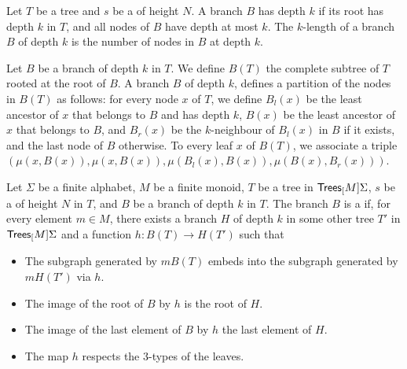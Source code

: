\begin{definition}
    \label{ramseyan-branch:def}
    Let $T$ be a tree and $s$ be a  of height $N$.
    A branch $B$ has depth $k$ if its root has depth $k$ in $T$,
    and all nodes of $B$ have depth at most $k$.
    The $k$-length of a branch $B$ of depth $k$ is the number of nodes in $B$
    at depth $k$.
\end{definition}

\AP Let $B$ be a branch of depth $k$ in $T$. We define $B(T)$ the complete
subtree of $T$ rooted at the root of $B$. A branch $B$ of depth $k$, defines a
partition of the nodes in $B(T)$ as follows: for every node $x$ of $T$, we
define $B_l(x)$ be the least ancestor of $x$ that belongs to $B$ and has depth
$k$, $B(x)$ be the least ancestor of $x$ that belongs to $B$, and $B_r(x)$ be
the $k$-neighbour of $B_l(x)$ in $B$ if it exists, and the last node of $B$
otherwise. To every leaf $x$ of $B(T)$, we associate a triple $(\mu(x, B(x)),
\mu(x,B(x)), \mu(B_l(x), B(x)), \mu(B(x), B_r(x)))$.

\begin{definition}
    \label{good-branch:def}
    Let $\Sigma$ be a finite alphabet, $M$ be a finite monoid, 
    $T$ be a tree in $\mathsf{Trees}_{[}M]{\Sigma}$, $s$ be a 
     of height $N$ in $T$,
    and $B$ be a branch of depth $k$ in $T$.
    The branch $B$ is a  if, for every element $m \in M$,
    there exists a branch $H$ of depth $k$ in some other tree $T'$ in $\mathsf{Trees}_{[}M]{\Sigma}$
    and a function $h \colon B(T) \to H(T')$ such that
    \begin{itemize}
        \item The subgraph generated by $m B(T)$ embeds into the subgraph generated by $m H(T')$ via $h$.
        \item The image of the root of $B$ by $h$ is the root of $H$.
        \item The image of the last element of $B$ by $h$ the last element of $H$.
        \item The map $h$ respects the $3$-types of the leaves.
    \end{itemize}
\end{definition}

